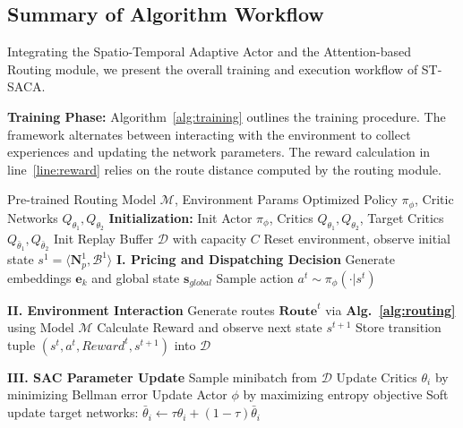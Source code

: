 \documentclass[lettersize,journal]{IEEEtran}
\begin{document}
\subsection{Summary of Algorithm Workflow}
\label{sec:workflow}

Integrating the Spatio-Temporal Adaptive Actor and the Attention-based Routing module, we present the overall training and execution workflow of ST-SACA.

\textbf{Training Phase:} Algorithm~\ref{alg:training} outlines the training procedure. The framework alternates between interacting with the environment to collect experiences and updating the network parameters. The reward calculation in line~\ref{line:reward} relies on the route distance computed by the routing module.

\begin{algorithm}[tb]
\caption{ST-SACA Policy Training} %
\label{alg:training}
\begin{algorithmic}[1]
\REQUIRE Pre-trained Routing Model $\mathcal{M}$, Environment Params
\ENSURE Optimized Policy $\pi_\phi$, Critic Networks $Q_{\theta_1}, Q_{\theta_2}$
\STATE \textbf{Initialization:} 
\STATE \quad Init Actor $\pi_\phi$, Critics $Q_{\theta_1}, Q_{\theta_2}$, Target Critics $Q_{\bar{\theta}_1}, Q_{\bar{\theta}_2}$
\STATE \quad Init Replay Buffer $\mathcal{D}$ with capacity $C$
    \STATE Reset environment, observe initial state $s^1 = \langle \mathbf{N}_p^1, \mathcal{B}^1 \rangle$
        \STATE \textbf{I. Pricing and Dispatching Decision}
        \STATE Generate embeddings $\mathbf{e}_k$ and global state $\mathbf{s}_{global}$
        \STATE Sample action $a^t \sim \pi_\phi(\cdot|s^t)$

        \STATE \textbf{II. Environment Interaction}
        \STATE Generate routes $\mathbf{Route}^t$ via \textbf{Alg.~\ref{alg:routing}} using Model $\mathcal{M}$
        \STATE Calculate Reward and observe next state $s^{t+1}$ \label{line:reward}
        \STATE Store transition tuple $(s^t, a^t, Reward^t, s^{t+1})$ into $\mathcal{D}$
        
        \STATE \textbf{III. SAC Parameter Update}
        \STATE Sample minibatch from $\mathcal{D}$
        \STATE Update Critics $\theta_i$ by minimizing Bellman error
        \STATE Update Actor $\phi$ by maximizing entropy objective
        \STATE Soft update target networks: $\bar{\theta}_i \leftarrow \tau\theta_i + (1-\tau)\bar{\theta}_i$
    \ENDFOR
\ENDFOR
\end{algorithmic}
\end{algorithm}
\end{document}
